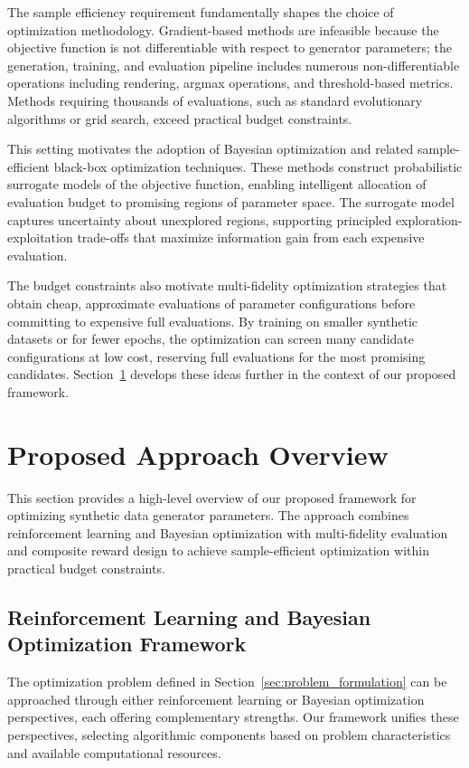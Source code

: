 The sample efficiency requirement fundamentally shapes the choice of optimization methodology. Gradient-based methods are infeasible because the objective function is not differentiable with respect to generator parameters; the generation, training, and evaluation pipeline includes numerous non-differentiable operations including rendering, argmax operations, and threshold-based metrics. Methods requiring thousands of evaluations, such as standard evolutionary algorithms or grid search, exceed practical budget constraints.

This setting motivates the adoption of Bayesian optimization and related sample-efficient black-box optimization techniques. These methods construct probabilistic surrogate models of the objective function, enabling intelligent allocation of evaluation budget to promising regions of parameter space. The surrogate model captures uncertainty about unexplored regions, supporting principled exploration-exploitation trade-offs that maximize information gain from each expensive evaluation.

The budget constraints also motivate multi-fidelity optimization strategies that obtain cheap, approximate evaluations of parameter configurations before committing to expensive full evaluations. By training on smaller synthetic datasets or for fewer epochs, the optimization can screen many candidate configurations at low cost, reserving full evaluations for the most promising candidates. Section~\ref{sec:proposed_approach} develops these ideas further in the context of our proposed framework.

\section{Proposed Approach Overview}
\label{sec:proposed_approach}

This section provides a high-level overview of our proposed framework for optimizing synthetic data generator parameters. The approach combines reinforcement learning and Bayesian optimization with multi-fidelity evaluation and composite reward design to achieve sample-efficient optimization within practical budget constraints.

\subsection{Reinforcement Learning and Bayesian Optimization Framework}
\label{subsec:rl_bayesian_framework}

The optimization problem defined in Section~\ref{sec:problem_formulation} can be approached through either reinforcement learning or Bayesian optimization perspectives, each offering complementary strengths. Our framework unifies these perspectives, selecting algorithmic components based on problem characteristics and available computational resources.

